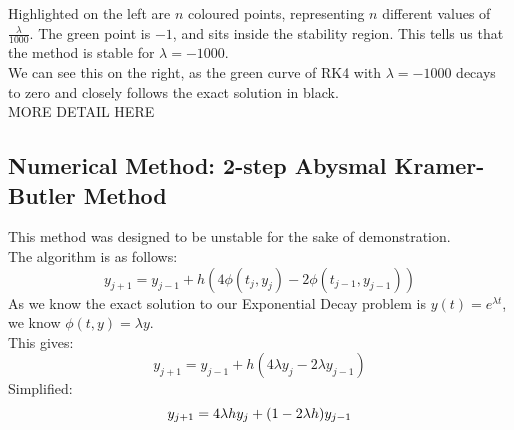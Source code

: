 \par Highlighted on the left are $n$ coloured points, representing $n$ different values of $\frac{\lambda}{1000}$.
The green point is $-1$, and sits inside the stability region.
This tells us that the method is stable for $\lambda = -1000$.\\
We can see this on the right, as the green curve of RK4 with $\lambda = -1000$ decays to zero and closely follows the exact solution in black.\\

MORE DETAIL HERE\\


\subsection{Numerical Method: 2-step Abysmal Kramer-Butler Method}

\par This method was designed to be unstable for the sake of demonstration.\\
The algorithm is as follows:
\[y_{j+1} = y_{j-1} + h(4\phi(t_j,y_j)-2\phi(t_{j-1},y_{j-1}))\]
As we know the exact solution to our Exponential Decay problem is $y(t) = e^{\lambda t}$, we know $\phi(t,y) = \lambda y$.\\
This gives:\\
\[y_{j+1} = y_{j-1} + h(4\lambda y_j - 2\lambda y_{j-1})\]
Simplified:\\
\[y_{j+1} = 4\lambda h y_j + (1-2\lambda h) y_{j-1}\]
